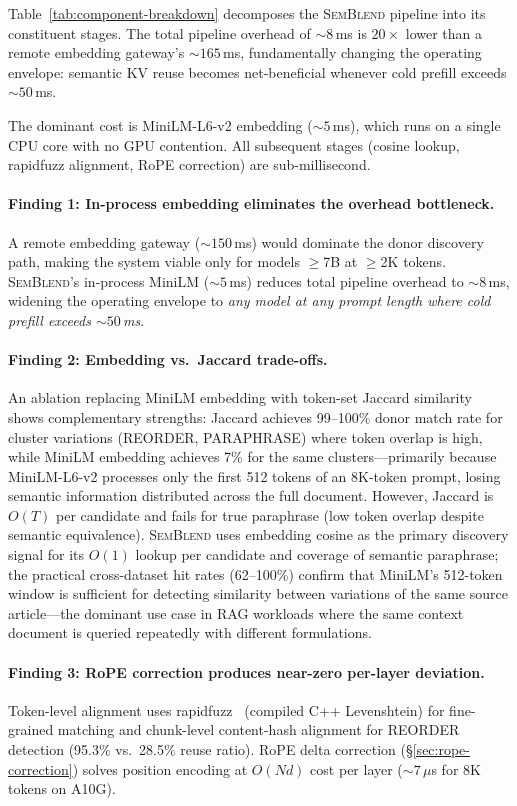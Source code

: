 \documentclass[10pt,twocolumn]{article}
\newcommand{\semblend}{\textsc{SemBlend}\xspace}
\begin{document}
Table~\ref{tab:component-breakdown} decomposes the \semblend
pipeline into its constituent stages. The total pipeline overhead of
${\sim}8$\,ms is $20\times$ lower than a remote embedding gateway's
${\sim}165$\,ms, fundamentally changing the operating envelope:
semantic KV reuse becomes net-beneficial whenever cold prefill exceeds
${\sim}50$\,ms.

The dominant cost is MiniLM-L6-v2 embedding (${\sim}5$\,ms), which runs
on a single CPU core with no GPU contention. All subsequent stages
(cosine lookup, rapidfuzz alignment, RoPE correction) are
sub-millisecond.

\paragraph{Finding 1: In-process embedding eliminates the overhead
bottleneck.}
A remote embedding gateway (${\sim}150$\,ms) would dominate the
donor discovery path, making the system viable only for models
$\geq$7B at $\geq$2K tokens. \semblend's in-process MiniLM
(${\sim}5$\,ms) reduces total pipeline overhead to ${\sim}8$\,ms,
widening the operating envelope to \emph{any model at any prompt
length where cold prefill exceeds ${\sim}50$\,ms}.

\paragraph{Finding 2: Embedding vs.\ Jaccard trade-offs.}
An ablation replacing MiniLM embedding with token-set Jaccard
similarity shows complementary strengths: Jaccard achieves 99--100\%
donor match rate for cluster variations (REORDER, PARAPHRASE) where
token overlap is high, while MiniLM embedding achieves 7\% for the
same clusters---primarily because MiniLM-L6-v2 processes only the
first 512 tokens of an 8K-token prompt, losing semantic information
distributed across the full document. However, Jaccard is $O(T)$
per candidate and fails for true paraphrase (low token overlap despite
semantic equivalence). \semblend uses embedding cosine as the
primary discovery signal for its $O(1)$ lookup per candidate and
coverage of semantic paraphrase; the practical cross-dataset
hit rates (62--100\%) confirm that MiniLM's 512-token window is
sufficient for detecting similarity between variations of the same
source article---the dominant use case in RAG workloads where the
same context document is queried repeatedly with different formulations.

\paragraph{Finding 3: RoPE correction produces near-zero per-layer deviation.}
Token-level alignment uses rapidfuzz~\cite{rapidfuzz} (compiled C++
Levenshtein) for fine-grained matching and chunk-level content-hash
alignment for REORDER detection (95.3\% vs.\ 28.5\% reuse ratio).
RoPE delta correction (\S\ref{sec:rope-correction}) solves position
encoding at $O(Nd)$ cost per layer (${\sim}7\,\mu$s for 8K tokens
on A10G).
\end{document}
